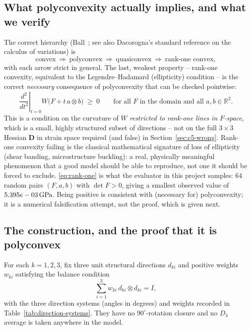 \documentclass[10pt,a4paper]{article}
\newcommand{\R}{\mathbb{R}}
\begin{document}
\subsection{What polyconvexity actually implies, and what we verify}
\label{sec:c5-implies}
The correct hierarchy (Ball~\cite{Ball1977}; see also Dacorogna's
standard reference on the calculus of variations) is
\begin{equation}
 \text{convex}\ \Longrightarrow\ \text{polyconvex}\ \Longrightarrow\
 \text{quasiconvex}\ \Longrightarrow\ \text{rank-one convex},
 \label{eq:hierarchy}
\end{equation}
with each arrow strict in general. The last, weakest property --
rank-one convexity, equivalent to the Legendre--Hadamard (ellipticity)
condition -- is the correct \emph{necessary} consequence of
polyconvexity that can be checked pointwise:
\begin{equation}
 \left.\frac{d^2}{dt^2}\right|_{t=0} W\big(F+t\,a\otimes b\big)\;\geq\;0
 \qquad\text{for all }F\text{ in the domain and all }a,b\in\R^2 .
 \label{eq:rank-one}
\end{equation}
This is a condition on the curvature of $W$ \emph{restricted to
rank-one lines in $F$-space}, which is a small, highly structured subset
of directions -- not on the full $3\times3$ Hessian $\bm D$ in strain
space required (and false) in Section~\ref{sec:c5-wrong}. Rank-one
convexity failing is the classical mathematical signature of loss of
ellipticity (shear banding, microstructure buckling): a real, physically
meaningful phenomenon that a good model should be able to reproduce, not
one it should be forced to exclude. \eqref{eq:rank-one} is what the
evaluator in this project samples: $64$ random pairs $(F,a,b)$ with $\det
F>0$, giving a smallest observed value of $5.395e-03\,\mathrm{GPa}$. Being
positive is consistent with (necessary for) polyconvexity; it is a
numerical falsification attempt, not the proof, which is given next.

\subsection{The construction, and the proof that it is polyconvex}
\label{sec:c5-construction}
For each $k=1,2,3$, fix three unit structural directions $d_{ki}$ and
positive weights $w_{ki}$ satisfying the balance condition
\begin{equation}
 \sum_{i=1}^3w_{ki}\,d_{ki}\otimes d_{ki}=I,
 \label{eq:balanced-directions}
\end{equation}
with the three direction systems (angles in degrees) and weights recorded
in Table~\ref{tab:direction-systems}. They have no $90^\circ$-rotation
closure and no $D_4$ average is taken anywhere in the model.
\end{document}
